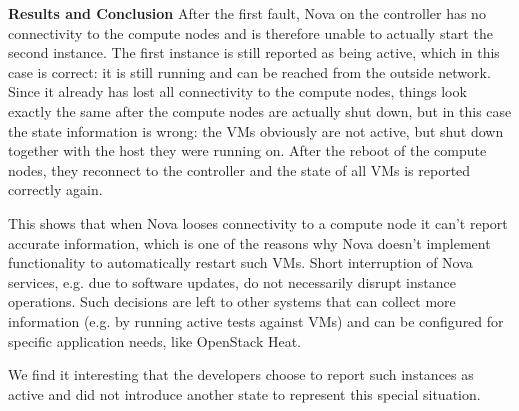 \textbf{Results and Conclusion}
After the first fault,  Nova on the controller has no connectivity to the compute nodes and is therefore unable to actually start the second instance. The first instance is still reported as being active, which in this case is correct: it is still running and can be reached from the outside network. Since it already has lost all connectivity to the compute nodes, things look exactly the same after the compute nodes are actually shut down, but in this case the state information is wrong: the VMs obviously are not active, but shut down together with the host they were running on. After the reboot of the compute nodes, they reconnect to the controller and the state of all VMs is reported correctly again.

This shows that when Nova looses connectivity to a compute node it can't report accurate information, which is one of the reasons why Nova doesn't implement functionality to automatically restart such VMs.  Short interruption of Nova services, e.g. due to software updates, do not necessarily disrupt instance operations. Such decisions are left to other systems that can collect more information (e.g. by running active tests against VMs) and can be configured for specific application needs, like OpenStack Heat. 

We find it interesting that the developers choose to report such instances as active and did not introduce another state to represent this special situation.

